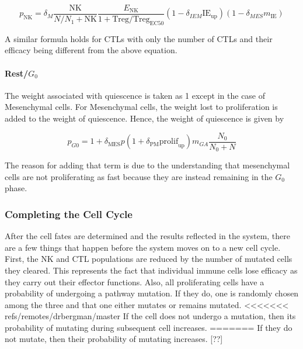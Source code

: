 \documentclass{article}
\begin{document}
$$ p_{\text{NK}} =\delta_M \frac{\text{NK}}{N/N_{1}+\text{NK}}  \frac{E_{\text{NK}}}{1+\text{Treg}/\text{Treg}_{\text{EC50}}} (1-\delta_{IEM}\text{IE}_{\text{up}})(1-\delta_{MES}m_{\text{IE}}) $$

A similar formula holds for CTLs with only the number of CTLs and their efficacy being different from the above equation.


\paragraph{Rest/$G_0$} %
The weight associated with quiescence is taken as 1 except in the case of Mesenchymal cells.
For Mesenchymal cells, the weight lost to proliferation is added to the weight of quiescence.
Hence, the weight of quiescence is given by

$$ p_{G0} = 1 + \delta_{\text{MES}}p(1+\delta_{\text{PM}}\text{prolif}_{\text{up}})m_{GA}\frac{N_0}{N_0+N} $$ 

The reason for adding that term is due to the understanding that mesenchymal cells are not proliferating as fast because they are instead remaining in the $G_0$ phase. %

\subsubsection{Completing the Cell Cycle}
After the cell fates are determined and the results reflected in the system, there are a few things that happen before the system moves on to a new cell cycle.
First, the NK and CTL populations are reduced by the number of mutated cells they cleared.
This represents the fact that individual immune cells lose efficacy as they carry out their effector functions. 
%
Also, all proliferating cells have a probability of undergoing a pathway mutation.
If they do, one is randomly chosen among the three and that one either mutates or remains mutated.
<<<<<<< refs/remotes/drbergman/master
If the cell does not undergo a mutation, then its probability of mutating during subsequent cell increases. 
%
=======
If they do not mutate, then their probability of mutating increases. [??]
\end{document}
